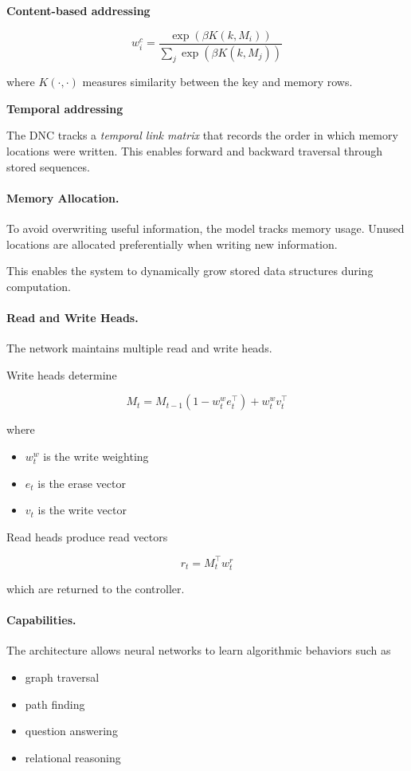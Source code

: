 \documentclass[12pt]{article}
\begin{document}
\textbf{Content-based addressing}

\[
		w^c_i = \frac{\exp(\beta K(k, M_i))}{\sum_j \exp(\beta K(k, M_j))}
\]

where $K(\cdot,\cdot)$ measures similarity between the key and memory rows.

\textbf{Temporal addressing}

The DNC tracks a \emph{temporal link matrix} that records the order in which memory
locations were written. This enables forward and backward traversal through stored
sequences.

\paragraph{Memory Allocation.}
To avoid overwriting useful information, the model tracks memory usage.
Unused locations are allocated preferentially when writing new information.

This enables the system to dynamically grow stored data structures
during computation.

\paragraph{Read and Write Heads.}

The network maintains multiple read and write heads.

Write heads determine

\[
		M_t = M_{t-1} (1 - w^w_t e_t^\top) + w^w_t v_t^\top
\]

where

\begin{itemize}
		\item $w^w_t$ is the write weighting
		\item $e_t$ is the erase vector
		\item $v_t$ is the write vector
\end{itemize}

Read heads produce read vectors

\[
		r_t = M_t^\top w^r_t
\]

which are returned to the controller.

\paragraph{Capabilities.}

The architecture allows neural networks to learn algorithmic behaviors such as

\begin{itemize}
		\item graph traversal
		\item path finding
		\item question answering
		\item relational reasoning
\end{itemize}
\end{document}
